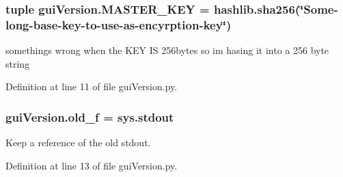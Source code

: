 \subsubsection[{M\+A\+S\+T\+E\+R\+\_\+\+K\+E\+Y}]{\setlength{\rightskip}{0pt plus 5cm}tuple gui\+Version.\+M\+A\+S\+T\+E\+R\+\_\+\+K\+E\+Y = hashlib.\+sha256(\char`\"{}Some-\/long-\/base-\/key-\/to-\/use-\/as-\/encyrption-\/key\char`\"{})}\label{namespacegui_version_ad80b491a9fbc91c221e73a124bff5d05}


somethings wrong when the K\+E\+Y I\+S 256bytes so im hasing it into a 256 byte string 



Definition at line 11 of file gui\+Version.\+py.

\hypertarget{namespacegui_version_a77c635f5f5d51002c89931af7228063c}{}
\subsubsection[{old\+\_\+f}]{\setlength{\rightskip}{0pt plus 5cm}gui\+Version.\+old\+\_\+f = sys.\+stdout}\label{namespacegui_version_a77c635f5f5d51002c89931af7228063c}


Keep a reference of the old stdout. 



Definition at line 13 of file gui\+Version.\+py.

